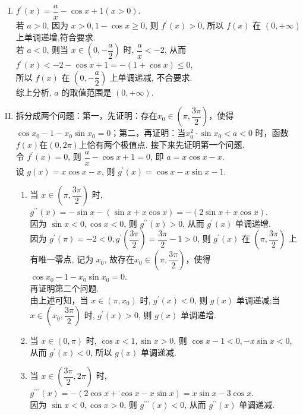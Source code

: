 \documentclass[11pt]{article}
\begin{document}
\begin{enumerate}
\begin{enumerate}[(I)]
		\item $f^{\prime}(x)=\dfrac{a}{x}-\cos x+1(x>0) $.
		\\若 $a>0$, 因为 $x>0,1-\cos x \geqslant 0$, 则 $f^{\prime}(x)>0$, 所以 $f(x)$ 在 $(0,+\infty)$ 上单调递增,符合要求.
		\\若 $a<0$, 则当 $x \in\left(0,-\dfrac{a}{2}\right)$ 时, $\dfrac{a}{x}<-2$, 从而 $f^{\prime}(x)<-2-\cos x+1=-(1+\cos x) \leqslant 0$,
		\\所以 $f(x)$ 在 $\left(0,-\dfrac{a}{2}\right)$ 上单调递减, 不合要求.
		\\综上分析, $a$ 的取值范围是 $(0,+\infty) .$
		\item \kaishu 拆分成两个问题：第一，先证明：存在$ x_0 \in \left ( \pi,\dfrac{3\pi}{2}  \right )  $，使得$ \cos x_0 - 1 - x_0 \sin x_0 =0$；第二，再证明：当$ x_0^2 \cdot \sin x_0 <a<0$	时，函数$ f(x) $在$ (0,2\pi) $上恰有两个极值点. 接下来先证明第一个问题.\songti \\令 $f^{\prime}(x)=0$, 则 $\dfrac{a}{x}-\cos x+1=0$, 即 $a=x \cos x-x$.
		\\设 $g(x)=x \cos x-x$, 则 $g^{\prime}(x)=\cos x-x \sin x-1$.
		\begin{enumerate}
			\item 当 $x \in\left(\pi, \dfrac{3 \pi}{2}\right)$ 时, $g^{\prime \prime}(x)=-\sin x-(\sin x+x \cos x)=-(2 \sin x+x \cos x)$.
			\\因为 $\sin x<0, \cos x<0$, 则 $g^{\prime \prime}(x)>0$, 从而 $g^{\prime}(x)$ 单调递增. 
			\\因为 $g^{\prime}(\pi)=-2<0, g^{\prime}\left(\dfrac{3 \pi}{2}\right)=\dfrac{3 \pi}{2}-1>0$,
			则 $g^{\prime}(x)$ 在 $\left(\pi, \dfrac{3 \pi}{2}\right)$ 上有唯一零点, 记为 $x_{0}$, 故存在$ x_0 \in \left ( \pi,\dfrac{3\pi}{2}  \right )  $，使得$ \cos x_0 - 1 - x_0 \sin x_0 =0$. 
			\\ \kaishu 再证明第二个问题. \songti
			\\由上述可知，当 $x \in\left(\pi, x_{0}\right)$ 时, $g^{\prime}(x)<0$, 则 $g(x)$ 单调递减;当 $x \in\left(x_{0}, \dfrac{3 \pi}{2}\right)$ 时, $g^{\prime}(x)>0$, 则 $g(x)$ 单调递增.
			\item 当 $x \in(0, \pi)$ 时, $\cos x<1, \sin x>0$, 则 $\cos x-1<0,-x \sin x<0$, 从而 $g^{\prime}(x)<0$, 所以 $g(x)$ 单调递减.
			\item 当 $x \in\left(\dfrac{3 \pi}{2}, 2 \pi\right)$ 时, $g^{\prime \prime \prime}(x)=-(2 \cos x+\cos x-x \sin x)=x \sin x-3 \cos x$.
			\\因为 $\sin x<0, \cos x>0$, 则 $g^{\prime \prime \prime}(x)<0$, 从而 $g^{\prime \prime}(x)$ 单调递减.

\end{enumerate}
\end{enumerate}
\end{enumerate}
\end{document}
